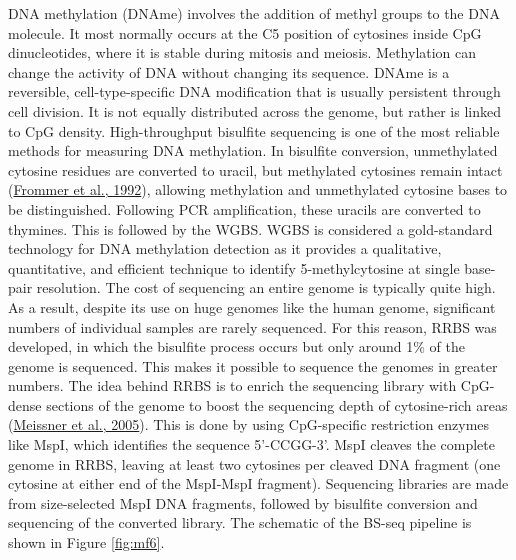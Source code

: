 \documentclass[12pt,twoside]{reedthesis}
\begin{document}
DNA methylation (DNAme) involves the addition of methyl groups to the
DNA molecule. It most normally occurs at the C5 position of cytosines
inside CpG dinucleotides, where it is stable during mitosis and meiosis.
Methylation can change the activity of DNA without changing its
sequence. DNAme is a reversible, cell-type-specific DNA modification
that is usually persistent through cell division. It is not equally
distributed across the genome, but rather is linked to CpG density.
High-throughput bisulfite sequencing is one of the most reliable methods
for measuring DNA methylation. In bisulfite conversion, unmethylated
cytosine residues are converted to uracil, but methylated cytosines
remain intact (\protect\hyperlink{ref-frommer1992}{Frommer et al., 1992}), allowing methylation and unmethylated
cytosine bases to be distinguished. Following PCR amplification, these
uracils are converted to thymines. This is followed by the WGBS. WGBS is
considered a gold-standard technology for DNA methylation detection as
it provides a qualitative, quantitative, and efficient technique to
identify 5-methylcytosine at single base-pair resolution. The cost of
sequencing an entire genome is typically quite high. As a result,
despite its use on huge genomes like the human genome, significant
numbers of individual samples are rarely sequenced. For this reason,
RRBS was developed, in which the bisulfite process occurs but only
around 1\% of the genome is sequenced. This makes it possible to sequence
the genomes in greater numbers. The idea behind RRBS is to enrich the
sequencing library with CpG-dense sections of the genome to boost the
sequencing depth of cytosine-rich areas (\protect\hyperlink{ref-meissner2005}{Meissner et al., 2005}). This is done by
using CpG-specific restriction enzymes like MspI, which identifies the
sequence 5'-CCGG-3'. MspI cleaves the complete genome in RRBS, leaving
at least two cytosines per cleaved DNA fragment (one cytosine at either
end of the MspI-MspI fragment). Sequencing libraries are made from
size-selected MspI DNA fragments, followed by bisulfite conversion and
sequencing of the converted library. The schematic of the BS-seq pipeline
is shown in Figure \ref{fig:mf6}.
\end{document}
